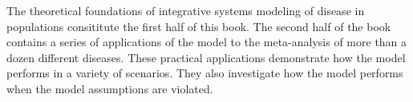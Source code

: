 The theoretical foundations of integrative systems modeling of disease
in populations consititute the first half of this book.  The second
half of the book contains a series of applications of the model to the
meta-analysis of more than a dozen different diseases.  These
practical applications demonstrate how the model performs in a variety
of scenarios. They also investigate how the model performs when the
model assumptions are violated.


